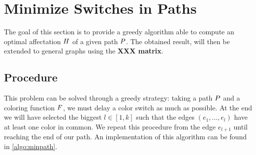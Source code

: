 \section{Minimize Switches in Paths}

The goal of this section is to provide a greedy algorithm able to compute an optimal affectation $H$ of a given path $P$. The obtained result, will then be extended to general graphs using the \textbf{XXX matrix}.

\subsection{Procedure}
\label{sec:path_proc}
This problem can be solved through a greedy strategy: taking a path $P$ and a coloring function $F$, we must delay a color switch as much as possible. At the end we will have selected the biggest $l \in [1, k]$ such that the edges $(e_1, \dots, e_l)$ have at least one color in common. We repeat this procedure from the edge $e_{l+1}$ until reaching the end of our path. An implementation of this algorithm can be found in \cref{algo:minpath}.

